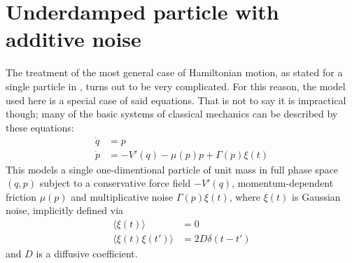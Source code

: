 \section{Underdamped particle with additive noise}
\label{sec:underdamped-model}

The treatment of the most general case of Hamiltonian motion, as stated for a single particle in , turns out to be very complicated. For this reason, the model used here is a special case of said equations. That is not to say it is impractical though; many of the basic systems of classical mechanics can be described by these equations:
%
\begin{equation}\boxed{\begin{split}
	\label{eqn:model hamiltonian eqns of motion}
	\dot q &= p \\
	\dot p &= -V'(q) - \mu(p)p + \Gamma(p)\xi(t)
\end{split}}\end{equation}
%
This models a single one-dimentional particle of unit mass in full phase space \((q,p)\) subject to a conservative force field \(-V'(q)\), momentum-dependent friction \(\mu(p)\) and multiplicative noise \(\Gamma(p)\xi(t)\), where \(\xi(t)\) is Gaussian noise, implicitly defined via
%
\begin{equation}\begin{split}
	\langle\xi(t)\rangle &= 0 \\
	\langle\xi(t)\xi(t')\rangle &= 2D\delta(t-t')
\end{split}\end{equation}
%
and \(D\) is a diffusive coefficient.

